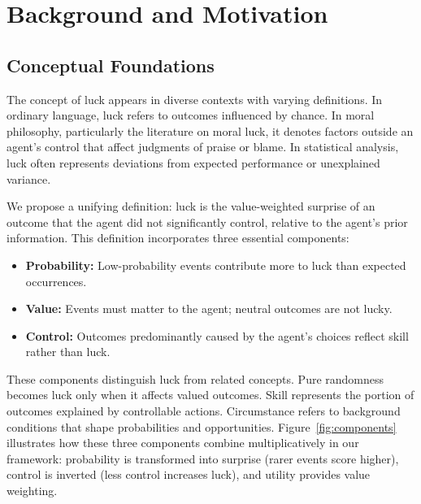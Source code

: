 \section{Background and Motivation}
\label{sec:background}

\subsection{Conceptual Foundations}

The concept of luck appears in diverse contexts with varying definitions.
In ordinary language, luck refers to outcomes influenced by chance. In
moral philosophy, particularly the literature on moral luck, it denotes
factors outside an agent's control that affect judgments of praise or
blame. In statistical analysis, luck often represents deviations from
expected performance or unexplained variance.

We propose a unifying definition: luck is the value-weighted surprise of
an outcome that the agent did not significantly control, relative to the
agent's prior information. This definition incorporates three essential components:

\begin{itemize}
  \item \textbf{Probability:} Low-probability events contribute more to
    luck than expected occurrences.

  \item \textbf{Value:} Events must matter to the agent; neutral outcomes
    are not lucky.

  \item \textbf{Control:} Outcomes predominantly caused by the agent's
    choices reflect skill rather than luck.
\end{itemize}

These components distinguish luck from related concepts. Pure randomness
becomes luck only when it affects valued outcomes. Skill represents the
portion of outcomes explained by controllable actions. Circumstance refers
to background conditions that shape probabilities and opportunities.
Figure~\ref{fig:components} illustrates how these three components combine
multiplicatively in our framework: probability is transformed into surprise
(rarer events score higher), control is inverted (less control increases luck),
and utility provides value weighting.

